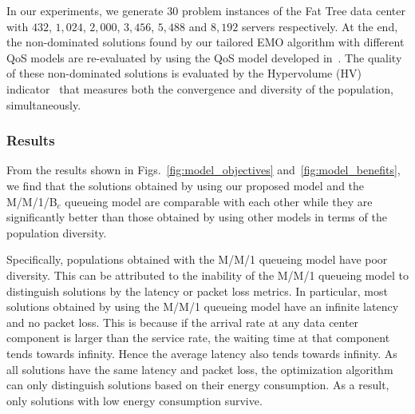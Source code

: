 In our experiments, we generate $30$ problem instances of the Fat Tree data center with $432$, $1,024$, $2,000$, $3,456$, $5,488$ and $8,192$ servers respectively. At the end, the non-dominated solutions found by our tailored EMO algorithm with different QoS models are re-evaluated by using the QoS model developed in~. The quality of these non-dominated solutions is evaluated by the Hypervolume (HV) indicator~\cite{ZitzlerT99} that measures both the convergence and diversity of the population, simultaneously.

\subsubsection{Results}

From the results shown in Figs.~\ref{fig:model_objectives} and~\ref{fig:model_benefits}, we find that the solutions obtained by using our proposed model and the M/M/1/B$_c$ queueing model are comparable with each other while they are significantly better than those obtained by using other models in terms of the population diversity.


Specifically, populations obtained with the M/M/1 queueing model have poor diversity. This can be attributed to the inability of the M/M/1 queueing model to distinguish solutions by the latency or packet loss metrics. In particular, most solutions obtained by using the M/M/1 queueing model have an infinite latency and no packet loss. This is because if the arrival rate at any data center component is larger than the service rate, the waiting time at that component tends towards infinity. Hence the average latency also tends towards infinity. As all solutions have the same latency and packet loss, the optimization algorithm can only distinguish solutions based on their energy consumption. As a result, only solutions with low energy consumption survive.

